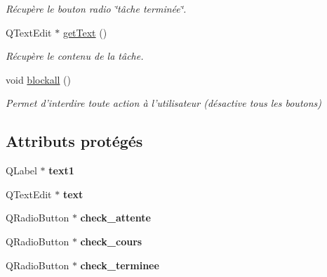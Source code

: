 \begin{DoxyCompactItemize}
\begin{DoxyCompactList}\small\item\em Récupère le bouton radio \char`\"{}tâche terminée\char`\"{}. \end{DoxyCompactList}\item 
\hypertarget{class_tache_editeur_acfec99ee9c6b73686543e1c24a87fd65}{Q\-Text\-Edit $\ast$ \hyperlink{class_tache_editeur_acfec99ee9c6b73686543e1c24a87fd65}{get\-Text} ()}\label{class_tache_editeur_acfec99ee9c6b73686543e1c24a87fd65}

\begin{DoxyCompactList}\small\item\em Récupère le contenu de la tâche. \end{DoxyCompactList}\item 
\hypertarget{class_tache_editeur_a1e77083a97efcfb689268852d32fcdb4}{void \hyperlink{class_tache_editeur_a1e77083a97efcfb689268852d32fcdb4}{blockall} ()}\label{class_tache_editeur_a1e77083a97efcfb689268852d32fcdb4}

\begin{DoxyCompactList}\small\item\em Permet d'interdire toute action à l'utilisateur (désactive tous les boutons) \end{DoxyCompactList}\end{DoxyCompactItemize}
\subsection*{Attributs protégés}
\begin{DoxyCompactItemize}
\item 
\hypertarget{class_tache_editeur_a9e01c2cf0f6512e5c0b879b600f69664}{Q\-Label $\ast$ {\bfseries text1}}\label{class_tache_editeur_a9e01c2cf0f6512e5c0b879b600f69664}

\item 
\hypertarget{class_tache_editeur_acdd7ae1e4b7476e8713ecb7a0d02b5cb}{Q\-Text\-Edit $\ast$ {\bfseries text}}\label{class_tache_editeur_acdd7ae1e4b7476e8713ecb7a0d02b5cb}

\item 
\hypertarget{class_tache_editeur_a010ba6dd713c2c7ad5df167bf439568a}{Q\-Radio\-Button $\ast$ {\bfseries check\-\_\-attente}}\label{class_tache_editeur_a010ba6dd713c2c7ad5df167bf439568a}

\item 
\hypertarget{class_tache_editeur_a3bbbd65e667e6e0cd7ddaea05d3961a8}{Q\-Radio\-Button $\ast$ {\bfseries check\-\_\-cours}}\label{class_tache_editeur_a3bbbd65e667e6e0cd7ddaea05d3961a8}

\item 
\hypertarget{class_tache_editeur_a6b4498fa419389c0c81c8d91f31e02a0}{Q\-Radio\-Button $\ast$ {\bfseries check\-\_\-terminee}}\label{class_tache_editeur_a6b4498fa419389c0c81c8d91f31e02a0}

\end{DoxyCompactItemize}


